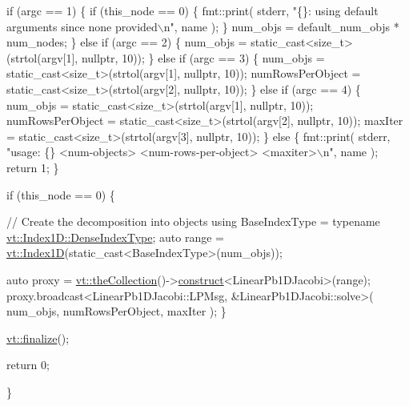 \begin{DoxyCodeInclude}
  \textcolor{keywordflow}{if} (argc == 1) \{
    \textcolor{keywordflow}{if} (this\_node == 0) \{
      fmt::print(
        stderr, \textcolor{stringliteral}{"\{\}: using default arguments since none provided\(\backslash\)n"}, name
      );
    \}
    num\_objs = default\_num\_objs * num\_nodes;
  \} \textcolor{keywordflow}{else} \textcolor{keywordflow}{if} (argc == 2) \{
    num\_objs = \textcolor{keyword}{static\_cast<}\textcolor{keywordtype}{size\_t}\textcolor{keyword}{>}(strtol(argv[1], \textcolor{keyword}{nullptr}, 10));
  \}
  \textcolor{keywordflow}{else} \textcolor{keywordflow}{if} (argc == 3) \{
    num\_objs = \textcolor{keyword}{static\_cast<}\textcolor{keywordtype}{size\_t}\textcolor{keyword}{>}(strtol(argv[1], \textcolor{keyword}{nullptr}, 10));
    numRowsPerObject = \textcolor{keyword}{static\_cast<}\textcolor{keywordtype}{size\_t}\textcolor{keyword}{>}(strtol(argv[2], \textcolor{keyword}{nullptr}, 10));
  \}
  \textcolor{keywordflow}{else} \textcolor{keywordflow}{if} (argc == 4) \{
    num\_objs = \textcolor{keyword}{static\_cast<}\textcolor{keywordtype}{size\_t}\textcolor{keyword}{>}(strtol(argv[1], \textcolor{keyword}{nullptr}, 10));
    numRowsPerObject = \textcolor{keyword}{static\_cast<}\textcolor{keywordtype}{size\_t}\textcolor{keyword}{>}(strtol(argv[2], \textcolor{keyword}{nullptr}, 10));
    maxIter = \textcolor{keyword}{static\_cast<}\textcolor{keywordtype}{size\_t}\textcolor{keyword}{>}(strtol(argv[3], \textcolor{keyword}{nullptr}, 10));
  \}
  \textcolor{keywordflow}{else} \{
    fmt::print(
      stderr, \textcolor{stringliteral}{"usage: \{\} <num-objects> <num-rows-per-object> <maxiter>\(\backslash\)n"},
      name
    );
    \textcolor{keywordflow}{return} 1;
  \}

  \textcolor{keywordflow}{if} (this\_node == 0) \{

    \textcolor{comment}{// Create the decomposition into objects}
    \textcolor{keyword}{using} BaseIndexType = \textcolor{keyword}{typename} \hyperlink{structvt_1_1index_1_1_dense_index_array_a36698427e28045290d1fb072573275ec}{vt::Index1D::DenseIndexType};
    \textcolor{keyword}{auto} range = \hyperlink{namespacevt_a5540efc78234273e1796fb003fe4d234}{vt::Index1D}(static\_cast<BaseIndexType>(num\_objs));

    \textcolor{keyword}{auto} proxy = \hyperlink{namespacevt_a1c45ce63bfd2c327ff7d76a319a371d8}{vt::theCollection}()->\hyperlink{structvt_1_1vrt_1_1collection_1_1_collection_manager_a4de84e9efd7a3948e3c20be549441cfd}{construct}<LinearPb1DJacobi>(range);
    proxy.broadcast<LinearPb1DJacobi::LPMsg, &LinearPb1DJacobi::solve>(
      num\_objs, numRowsPerObject, maxIter
    );
  \}

  \hyperlink{namespacevt_a540d90dbd6e97b69f1dcbc9ee9314cff}{vt::finalize}();

  \textcolor{keywordflow}{return} 0;

\}
\end{DoxyCodeInclude}

